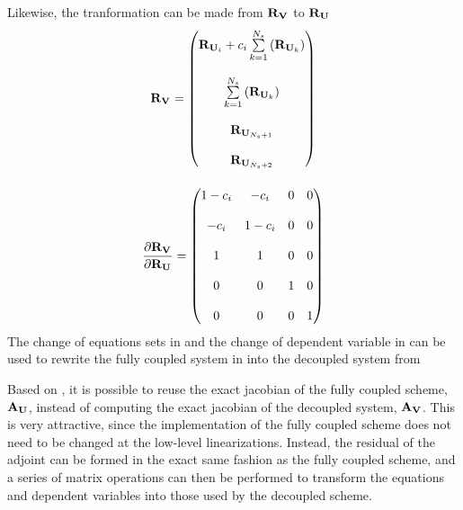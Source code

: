 Likewise, the tranformation can be made from $\mathbf R_{{\mathbf V}_{}}$ to $\mathbf R_{{\mathbf U}_{}}$
\begin{gather}
  \mathbf R_{{\mathbf V}_{}} =
  \begin{pmatrix}
    \mathbf R_{{\mathbf U}_{i}} + c_i \sum\limits_{k=1}^{N_s}{\left( \mathbf R_{{\mathbf U}_{k}} \right)} \\ \\
    \sum\limits_{k=1}^{N_s}{\left( \mathbf R_{{\mathbf U}_{k}} \right)} \\ \\
    \mathbf R_{{\mathbf U}_{N_s+1}} \\ \\
    \mathbf R_{{\mathbf U}_{N_s+2}}
  \end{pmatrix}
  \label{rv-to-ru} \\[12pt]
  \frac{\partial \mathbf R_{{\mathbf V}_{}}}{\partial \mathbf R_{{\mathbf U}_{}}} =
  \begin{pmatrix}
    1 - c_i & -c_i    & 0 & 0 \\ \\
    -c_i    & 1 - c_i & 0 & 0 \\ \\
    1       & 1       & 0 & 0 \\ \\
    0       & 0       & 1 & 0 \\ \\
    0       & 0       & 0 & 1
  \end{pmatrix}
  \label{drvdru}
\end{gather}
The change of equations sets in  and the change of
dependent variable in  can be used to rewrite the fully coupled
system in  into the decoupled system from 



Based on , it is possible to reuse the exact jacobian of the
fully coupled scheme, $\mathbf A_{\mathbf U}$, instead of computing the exact jacobian of
the decoupled system, $\mathbf A_{\mathbf V}$.  This is very attractive, since the
implementation of the fully coupled scheme does not need to be changed at the
low-level linearizations.  Instead, the residual of the adjoint can be formed in
the exact same fashion as the fully coupled scheme, and a series of matrix
operations can then be performed to transform the equations and dependent
variables into those used by the decoupled scheme.

